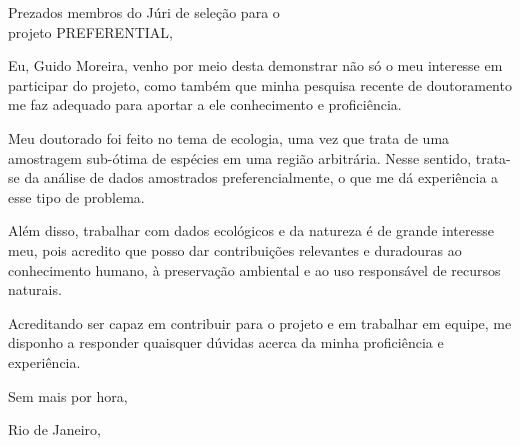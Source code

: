 \documentclass[11pt]{letter}
\date{}
\begin{document}
	\begin{letter}{}\large
		\opening{Prezados membros do Júri de seleção para o\\projeto PREFERENTIAL,}
Eu, Guido Moreira, venho por meio desta demonstrar não só o meu interesse em participar do projeto, como também que minha pesquisa recente de doutoramento me faz adequado para aportar a ele conhecimento e proficiência.

Meu doutorado foi feito no tema de ecologia, uma vez que trata de uma amostragem sub-ótima de espécies em uma região arbitrária. Nesse sentido, trata-se da análise de dados amostrados preferencialmente, o que me dá experiência a esse tipo de problema.

Além disso, trabalhar com dados ecológicos e da natureza é de grande interesse meu, pois acredito que posso dar contribuições relevantes e duradouras ao conhecimento humano, à preservação ambiental e ao uso responsável de recursos naturais.

Acreditando ser capaz em contribuir para o projeto e em trabalhar em equipe, me disponho a responder quaisquer dúvidas acerca da minha proficiência e experiência.

Sem mais por hora,

		\closing{Rio de Janeiro,}
				
	\end{letter}
	
\end{document}
